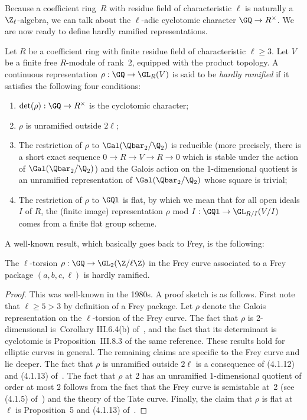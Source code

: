 Because a coefficient ring~$R$ with residue field of characteristic $\ell$ is naturally
a $\Z_\ell$-algebra, we can talk about the $\ell$-adic cyclotomic character $\GQ\to R^\times$.
We are now ready to define hardly ramified representations.

\begin{definition}
  \label{hardly_ramified}
  \leanok
  Let $R$ be a coefficient ring with finite residue field of characteristic $\ell\geq3$.
  Let $V$ be a finite free $R$-module of rank~2, equipped with the product topology. A
  continuous representation $\rho: \GQ\to \GL_R(V)$ is said to be \emph{hardly ramified} if it
  satisfies the following four conditions:
  \begin{enumerate}
  \item $\det(\rho):\GQ\to R^\times$ is the cyclotomic character;
  \item $\rho$ is unramified outside $2\ell$;
  \item The restriction of $\rho$ to $\Gal(\Qbar_2/\Q_2)$ is reducible (more precisely,
  there is a short exact sequence $0\to R\to V\to R\to 0$ which is stable
  under the action of $\Gal(\Qbar_2/\Q_2)$) and the Galois action on the 1-dimensional
  quotient is an unramified representation of $\Gal(\Qbar_2/\Q_2)$ whose square is trivial;
  \item The restriction of $\rho$ to $\GQl$ is flat, by which we mean that for all open
  ideals $I$ of $R$, the (finite image) representation $\rho$ mod $I:\GQl\to \GL_{R/I}(V/I)$
  comes from a finite flat group scheme.
  \end{enumerate}
\end{definition}

A well-known result, which basically goes back to Frey, is the following:

\begin{theorem}
  \label{Frey_curve_hardly_ramified}
  \leanok
  The $\ell$-torsion $\rho:\GQ\to\GL_2(\Z/\ell\Z)$ in the Frey curve associated to a Frey
  package $(a,b,c,\ell)$ is hardly ramified.
\end{theorem}
\begin{proof}
  This was well-known in the 1980s. A proof sketch is as follows.
  First note that $\ell\geq5>3$ by definition of a Frey package. Let $\rho$
  denote the Galois representation on the $\ell$-torsion of the Frey curve.
  The fact that $\rho$ is 2-dimensional is~Corollary
  III.6.4(b) of~\cite{silverman1}, and the fact that its determinant is
  cyclotomic is Proposition~III.8.3 of the same reference. These results hold for elliptic curves
  in general. The remaining claims are specific to the Frey curve and lie
  deeper. The fact that $\rho$ is unramified outside $2\ell$ is a consequence
  of (4.1.12) and (4.1.13) of~\cite{serreconj}. The fact that $\rho$ at 2
  has an unramified 1-dimensional quotient of order at most 2 follows from
  the fact that the Frey curve is semistable at~2 (see (4.1.5) of~\cite{serreconj})
  and the theory of the Tate curve. Finally, the claim that $\rho$ is flat at $\ell$
  is Proposition~5 and (4.1.13) of~\cite{serreconj}.
\end{proof}



